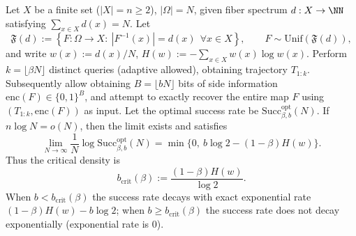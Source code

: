 \begin{conclusion}\label{con:xi-terminal-linear-strong-converse-query-sideinfo}
Let \(X\) be a finite set (\(|X|=n\ge 2\)), \(|\Omega|=N\), given fiber spectrum \(d:X\to\NN\) satisfying \(\sum_{x\in X}d(x)=N\).
Let
\[
\mathfrak{F}(d):=\left\{F:\Omega\to X:\ |F^{-1}(x)|=d(x)\ \ \forall x\in X\right\},
\qquad
F\sim\mathrm{Unif}(\mathfrak{F}(d)),
\]
and write \(w(x):=d(x)/N\), \(H(w):=-\sum_{x\in X}w(x)\log w(x)\).
Perform \(k=\lfloor \beta N\rfloor\) distinct queries (adaptive allowed), obtaining trajectory \(T_{1:k}\).
Subsequently allow obtaining \(B=\lfloor bN\rfloor\) bits of side information \(\mathrm{enc}(F)\in\{0,1\}^B\), and attempt to exactly recover the entire map \(F\) using \((T_{1:k},\mathrm{enc}(F))\) as input.
Let the optimal success rate be \(\mathrm{Succ}^{\mathrm{opt}}_{\beta,b}(N)\).
If \(n\log N=o(N)\), then the limit exists and satisfies
\[
\boxed{\;
\lim_{N\to\infty}\frac{1}{N}\log \mathrm{Succ}^{\mathrm{opt}}_{\beta,b}(N)
=
\min\bigl\{0,\ b\log 2-(1-\beta)H(w)\bigr\}.\;}
\]
Thus the critical density is
\[
b_{\mathrm{crit}}(\beta):=\frac{(1-\beta)H(w)}{\log 2}.
\]
When \(b<b_{\mathrm{crit}}(\beta)\) the success rate decays with exact exponential rate \((1-\beta)H(w)-b\log 2\); when \(b\ge b_{\mathrm{crit}}(\beta)\) the success rate does not decay exponentially (exponential rate is \(0\)).
\end{conclusion}
